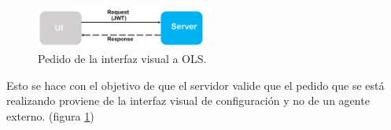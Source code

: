 \begin{figure}
\vspace{-20pt}
\begin{center}
\includegraphics[width=0.52\textwidth]{images/request.png} 
\end{center} \vspace{-20pt} \caption{Pedido de la interfaz visual a OLS.}  \label{request} \vspace{-10pt} 
\end{figure}

Esto se hace con el objetivo de que el servidor valide que el pedido que se est\'a realizando proviene de la interfaz visual de configuraci\'on y no de un agente externo. (figura \ref{request})





 